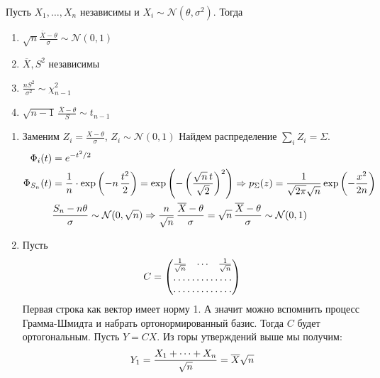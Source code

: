 \documentclass[12pt,timbord]{../../../notes}
\begin{document}
\begin{lem}[Фишера]\label{lem:stat::fishlem::fishlem}
  Пусть $X_1, \dotsc, X_n$ независимы и $X_i \sim \mathcal N (\theta,\sigma^2)$. Тогда
  \begin{enumerate}
    \item 
      $\displaystyle\sqrt n \frac{\overline X - \theta}{\sigma} \sim \mathcal N(0,1)$
    \item $\overline{X}, S^2$ независимы 
    \item $\displaystyle \frac{n S^2}{\sigma^2} \sim \chi_{n-1}^2 $
    \item $\displaystyle \sqrt{n-1}\, \frac{\overline X - \theta }{S}  \sim t_{n-1}$
  \end{enumerate}
\end{lem}
\begin{ittproof}
  \begin{enumerate}
    \item Заменим $Z_i = \frac{X-\theta }{\sigma}$, $Z_i \sim \mathcal N(0,1)$
      Найдем распределение $\sum_i Z_i= \Sigma$. 
      \begin{align*}
        \Phi_i (t) &= e^{-t^2/2} \\
        \Phi_{S_n} (t) &= \frac 1 n \cdot \exp \left( -n\,\frac{t^2}{2} \right) 
        = \exp \left( -\left(\frac{\sqrt n\, t}{\sqrt 2} \right)^2\right)
        \Rightarrow 
        p_{\Sigma}(z) = \frac{1}{\sqrt{2\pi}\sqrt n} \exp \left( -\frac{x^2}{2 n}\right)\\
        &\frac{S_n - n\theta}{\sigma} \sim \mathcal N (0, \sqrt n) \Rightarrow 
        \frac{n}{\sqrt n} \,  \frac{\overline{X} - \theta}{\sigma} = \sqrt n\,\frac{\overline{X} -\theta}{\sigma}
        \sim \mathcal N(0,1)
      \end{align*}
    \item Пусть
      \[
        C = \begin{pmatrix}
          \frac{1}{\sqrt n} & \cdots & \frac{1}{\sqrt n} \\
          \hdotsfor{3} \\
          \hdotsfor{3}
        \end{pmatrix}
      \]
      Первая строка как вектор имеет норму 1. А значит можно вспомнить процесс Грамма-Шмидта и
      набрать ортонормированный базис. Тогда $C$ будет ортогональным. Пусть $Y = CX$. Из горы
      утверждений выше мы получим:
      \begin{align*}
        Y_1 &= \frac{X_1 + \dotsb + X_n}{\sqrt n} = \av X \sqrt n \\

\end{align*}
\end{enumerate}
\end{ittproof}
\end{document}
